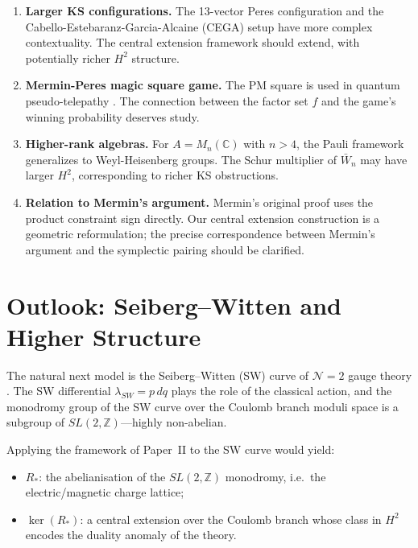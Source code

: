 \documentclass[11pt]{article}
\begin{document}
\begin{enumerate}
  \item \textbf{Larger KS configurations.} The 13-vector Peres configuration
        \cite{Peres90} and the Cabello-Estebaranz-Garcia-Alcaine (CEGA)
        setup \cite{CEGA96} have more complex contextuality. The central extension
        framework should extend, with potentially richer $H^2$ structure.

  \item \textbf{Mermin-Peres magic square game.} The PM square is used in
        quantum pseudo-telepathy \cite{BBT08}. The connection between the
        factor set $f$ and the game's winning probability deserves study.

  \item \textbf{Higher-rank algebras.} For $A = M_n(\mathbb{C})$ with
        $n > 4$, the Pauli framework generalizes to Weyl-Heisenberg
        groups. The Schur multiplier of $\bar{W}_n$ may have larger
        $H^2$, corresponding to richer KS obstructions.

  \item \textbf{Relation to Mermin's argument.} Mermin's original proof
        \cite{Mermin90} uses the product constraint sign directly.
        Our central extension construction is a geometric reformulation; the
        precise correspondence between Mermin's argument and the
        symplectic pairing should be clarified.
\end{enumerate}

\section{Outlook: Seiberg--Witten and Higher Structure}
\label{sec:outlook}

The natural next model is the Seiberg--Witten (SW) curve of $\mathcal{N}=2$
gauge theory \cite{SW94}. The SW differential $\lambda_{SW} = p\,dq$
plays the role of the classical action, and the monodromy group of the
SW curve over the Coulomb branch moduli space is a subgroup of
$SL(2,\mathbb{Z})$---highly non-abelian.

Applying the framework of Paper~II to the SW curve would yield:
\begin{itemize}
  \item $R_*$: the abelianisation of the $SL(2,\mathbb{Z})$ monodromy,
        i.e.\ the electric/magnetic charge lattice;
  \item $\ker(R_*)$: a central extension over the Coulomb branch whose class
        in $H^2$ encodes the duality anomaly of the theory.
\end{itemize}
\end{document}
